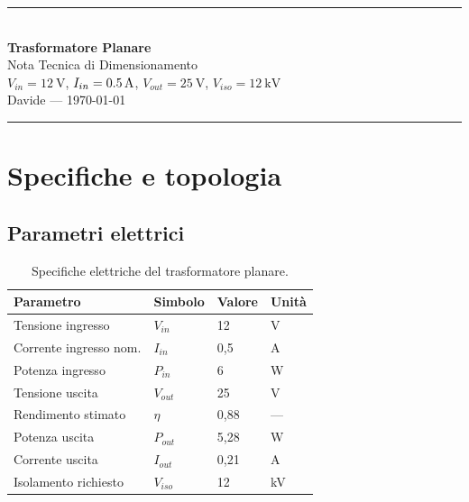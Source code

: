 \documentclass[a4paper,11pt]{article}
\begin{document}

\begin{center}
  {\color{primary}\rule{\linewidth}{1.5pt}}\\[6pt]
  {\Large\bfseries\color{primary} Trasformatore Planare}\\[4pt]
  {\large Nota Tecnica di Dimensionamento}\\[4pt]
  {\normalsize
    $V_{in} = \SI{12}{\volt}$,\quad
    $I_{in} = \SI{0{,}5}{\ampere}$,\quad
    $V_{out} = \SI{25}{\volt}$,\quad
    $V_{iso} = \SI{12}{\kilo\volt}$
  }\\[4pt]
  {\small Davide \quad — \quad \today}\\[6pt]
  {\color{primary}\rule{\linewidth}{1.5pt}}
\end{center}

\vspace{4pt}

\section{Specifiche e topologia}

\subsection{Parametri elettrici}

\begin{table}[H]
\centering
\caption{Specifiche elettriche del trasformatore planare.}
\label{tab:specs}
\begin{tabularx}{\linewidth}{L{4.5cm} C{2.5cm} C{2.5cm} L{4cm}}
\toprule
\textbf{Parametro} & \textbf{Simbolo} & \textbf{Valore} & \textbf{Unità} \\
\midrule
Tensione ingresso      & $V_{in}$    & 12    & \si{\volt}      \\
Corrente ingresso nom. & $I_{in}$    & 0{,}5 & \si{\ampere}    \\
Potenza ingresso       & $P_{in}$    & 6     & \si{\watt}      \\
Tensione uscita        & $V_{out}$   & 25    & \si{\volt}      \\
Rendimento stimato     & $\eta$      & 0{,}88 & —              \\
Potenza uscita         & $P_{out}$   & 5{,}28 & \si{\watt}     \\
Corrente uscita        & $I_{out}$   & 0{,}21 & \si{\ampere}   \\
Isolamento richiesto   & $V_{iso}$   & 12    & \si{\kilo\volt} \\
\bottomrule
\end{tabularx}
\end{table}
\end{document}
